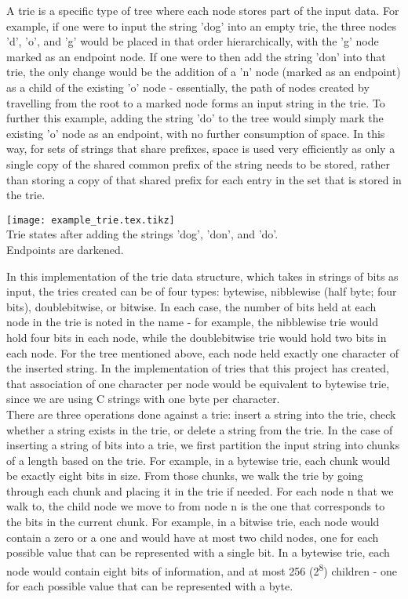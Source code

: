 \documentclass{llncs}
\begin{document}
A trie is a specific type of tree where each node stores part of the input data. For example, if one were to input the string 'dog' into an empty trie, the three nodes 'd', 'o', and 'g' would be placed in that order hierarchically, with the 'g' node marked as an endpoint node. If one were to then add the string 'don' into that trie, the only change would be the addition of a 'n' node (marked as an endpoint) as a child of the existing 'o' node - essentially, the path of nodes created by travelling from the root to a marked node forms an input string in the trie. To further this example, adding the string 'do' to the tree would simply mark the existing 'o' node as an endpoint, with no further consumption of space. In this way, for sets of strings that share prefixes, space is used very efficiently as only a single copy of the shared common prefix of the string needs to be stored, rather than storing a copy of that shared prefix for each entry in the set that is stored in the trie. \\ 
\begin{center}
\texttt{[image: example\_trie.tex.tikz]}
\\
Trie states after adding the strings 'dog', 'don', and 'do'.\\
Endpoints are darkened.\\
\end{center}
In this implementation of the trie data structure, which takes in strings of bits as input, the tries created can be of four types: bytewise, nibblewise (half byte; four bits), doublebitwise, or bitwise. In each case, the number of bits held at each node in the trie is noted in the name - for example, the nibblewise trie would hold four bits in each node, while the doublebitwise trie would hold two bits in each node. For the tree mentioned above, each node held exactly one character of the inserted string. In the implementation of tries that this project has created, that association of one character per node would be equivalent to bytewise trie, since we are using C strings with one byte per character. \\

There are three operations done against a trie: insert a string into the trie, check whether a string exists in the trie, or delete a string from the trie. In the case of inserting a string of bits into a trie, we first partition the input string into chunks of a length based on the trie. For example, in a bytewise trie, each chunk would be exactly eight bits in size. From those chunks, we walk the trie by going through each chunk and placing it in the trie if needed. For each node n that we walk to, the child node we move to from node n is the one that corresponds to the bits in the current chunk. For example, in a bitwise trie, each node would contain a zero or a one and would have at most two child nodes, one for each possible value that can be represented with a single bit. In a bytewise trie, each node would contain eight bits of information, and at most 256 (2\textsuperscript{8}) children - one for each possible value that can be represented with a byte. \\
\end{document}
